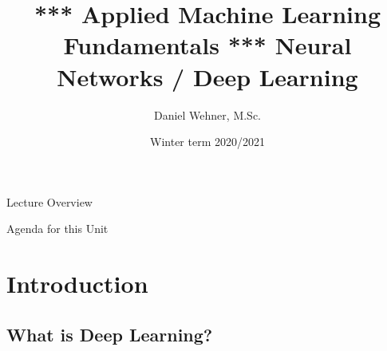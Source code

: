 


\title[Deep Learning]{*** Applied Machine Learning Fundamentals *** Neural Networks / Deep Learning}
\author{Daniel Wehner, M.Sc.}
\date{Winter term 2020/2021}




\maketitlepage


\begin{frame}{Lecture Overview}{}
\end{frame}


\begin{frame}{Agenda for this Unit}
	\begin{multicols}{2}
		\tableofcontents
	\end{multicols}
\end{frame}


\section{Introduction}

\subsection{What is Deep Learning?}


